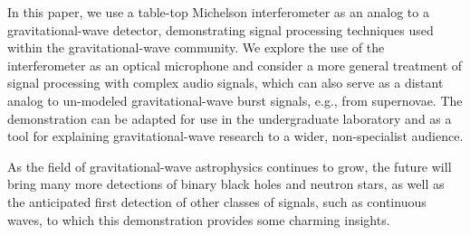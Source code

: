 \documentclass[paper-main.tex]{subfiles}
\begin{document}


In this paper, we use a table-top Michelson interferometer as an analog to a gravitational-wave detector, demonstrating signal processing techniques used within the gravitational-wave community.
We explore the use of the interferometer as an optical microphone and consider a more general treatment of signal processing with complex audio signals, which can also serve as a distant analog to un-modeled gravitational-wave burst signals, e.g., from supernovae.
The demonstration can be adapted for use in the undergraduate laboratory and as a tool for explaining gravitational-wave research to a wider, non-specialist audience. 


\begin{comment}

The demonstration presented has the potential to be adapted for use in the undergraduate laboratory.
It can be used to teach topics of interest to physics and electrical engineering students including interferometer physics; gravitational-wave detection, searches, and analysis; and signal processing with filters and speech enhancement techniques. 
The increased excitement and public interest in the field of gravitational-wave research in recent years mean that this demonstration may also be adapted as a tool for explaining gravitational-wave research to a wider, non-specialist audience. 

\end{comment}

As the field of gravitational-wave astrophysics continues to grow, the future will bring many more detections of binary black holes and neutron stars, as well as the anticipated first detection of other classes of signals, such as continuous waves, to which this demonstration provides some charming insights. 
\end{document}
